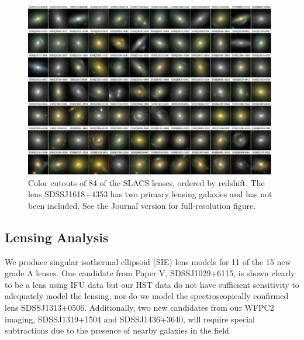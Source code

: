 \documentclass[iop]{emulateapj}
\begin{document}
\begin{figure}[ht]
 \includegraphics[width=0.98\textwidth,clip]{f2.eps}
 \caption{Color cutouts of 84 of the SLACS lenses, ordered by redshift. The lens SDSSJ1618+4353 has two primary lensing galaxies and has not been included. See the Journal version for full-resolution figure.}
 \label{F_color_cutouts}
\end{figure}


\subsection{Lensing Analysis}
We produce singular isothermal ellipsoid (SIE) lens models \citep[e.g.,][]{kormann} for 11 of the 15 new grade A lenses. One candidate from Paper V, SDSSJ1029+6115, is shown clearly to be a lens using IFU data but our HST data do not have sufficient sensitivity to adequately model the lensing, nor do we model the spectroscopically confirmed lens SDSSJ1313+0506. Additionally, two new candidates from our WFPC2 imaging, SDSSJ1319+1504 and SDSSJ1436+3640, will require special subtractions due to the presence of nearby galaxies in the field.
\end{document}

